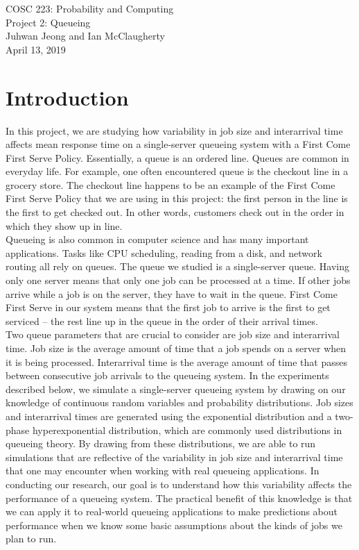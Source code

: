 \documentclass[12pt]{article}
\begin{document}
\begin{center}
\Large{COSC 223: Probability and Computing} \\
\Large{Project 2: Queueing} \\ 
\large{Juhwan Jeong and Ian McClaugherty} \\
\large{April 13, 2019}
\end{center}

\section{Introduction}
In this project, we are studying how variability in job size and interarrival time affects mean response time on a single-server queueing system with a First Come First Serve Policy. Essentially, a queue is an ordered line. Queues are common in everyday life. For example, one often encountered queue is the checkout line in a grocery store. The checkout line happens to be an example of the First Come First Serve Policy that we are using in this project: the first person in the line is the first to get checked out. In other words, customers check out in the order in which they show up in line.  \\ 

Queueing is also common in computer science and has many important applications. Tasks like CPU scheduling, reading from a disk, and network routing all rely on queues. The queue we studied is a single-server queue. Having only one server means that only one job can be processed at a time. If other jobs arrive while a job is on the server, they have to wait in the queue. First Come First Serve in our system means that the first job to arrive is the first to get serviced -- the rest line up in the queue in the order of their arrival times. \\

Two queue parameters that are crucial to consider are job size and interarrival time.  Job size is the average amount of time that a job spends on a server when it is being processed. Interarrival time is the average amount of time that passes between consecutive job arrivals to the queueing system. In the experiments described below, we simulate a single-server queueing system by drawing on our knowledge of continuous random variables and  probability distributions. Job sizes and interarrival times are generated using the exponential distribution and a two-phase hyperexponential distribution, which are commonly used distributions in queueing theory. By drawing from these distributions, we are able to run simulations that are reflective of the variability in job size and interarrival time that one may encounter when working with real queueing applications. In conducting our research, our goal is to understand how this variability affects the performance of a queueing system. The practical benefit of this knowledge is that we can apply it to real-world queueing applications to make predictions about performance when we know some basic assumptions about the kinds of jobs we plan to run. 
\end{document}
